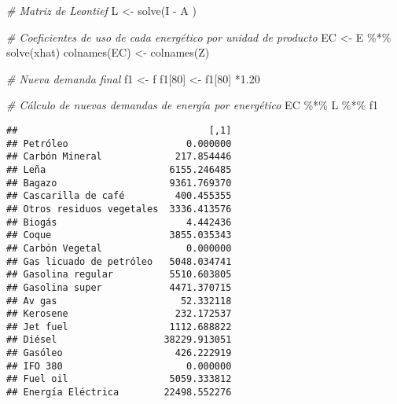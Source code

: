 \documentclass[
]{article}
\newenvironment{Shaded}{\begin{snugshade}}{\end{snugshade}}
\newcommand{\CommentTok}[1]{\textcolor[rgb]{0.56,0.35,0.01}{\textit{#1}}}
\newcommand{\DecValTok}[1]{\textcolor[rgb]{0.00,0.00,0.81}{#1}}
\newcommand{\FloatTok}[1]{\textcolor[rgb]{0.00,0.00,0.81}{#1}}
\newcommand{\FunctionTok}[1]{\textcolor[rgb]{0.00,0.00,0.00}{#1}}
\newcommand{\NormalTok}[1]{#1}
\newcommand{\OtherTok}[1]{\textcolor[rgb]{0.56,0.35,0.01}{#1}}
\newcommand{\SpecialCharTok}[1]{\textcolor[rgb]{0.00,0.00,0.00}{#1}}
\begin{document}
\begin{Shaded}
\begin{Highlighting}[]
\CommentTok{\# Matriz de Leontief}
\NormalTok{L }\OtherTok{\textless{}{-}} \FunctionTok{solve}\NormalTok{(I }\SpecialCharTok{{-}}\NormalTok{ A )}

\CommentTok{\# Coeficientes de uso de cada energético por unidad de producto}
\NormalTok{EC }\OtherTok{\textless{}{-}}\NormalTok{ E }\SpecialCharTok{\%*\%} \FunctionTok{solve}\NormalTok{(xhat)}
\FunctionTok{colnames}\NormalTok{(EC) }\OtherTok{\textless{}{-}} \FunctionTok{colnames}\NormalTok{(Z)}

\CommentTok{\# Nueva demanda final}
\NormalTok{f1 }\OtherTok{\textless{}{-}}\NormalTok{ f}
\NormalTok{f1[}\DecValTok{80}\NormalTok{] }\OtherTok{\textless{}{-}}\NormalTok{ f1[}\DecValTok{80}\NormalTok{] }\SpecialCharTok{*}\FloatTok{1.20}

\CommentTok{\# Cálculo de nuevas demandas de energía por energético}
\NormalTok{EC }\SpecialCharTok{\%*\%}\NormalTok{ L }\SpecialCharTok{\%*\%}\NormalTok{ f1}
\end{Highlighting}
\end{Shaded}

\begin{verbatim}
##                                  [,1]
## Petróleo                     0.000000
## Carbón Mineral             217.854446
## Leña                      6155.246485
## Bagazo                    9361.769370
## Cascarilla de café         400.455355
## Otros residuos vegetales  3336.413576
## Biogás                       4.442436
## Coque                     3855.035343
## Carbón Vegetal               0.000000
## Gas licuado de petróleo   5048.034741
## Gasolina regular          5510.603805
## Gasolina super            4471.370715
## Av gas                      52.332118
## Kerosene                   232.172537
## Jet fuel                  1112.688822
## Diésel                   38229.913051
## Gasóleo                    426.222919
## IFO 380                      0.000000
## Fuel oil                  5059.333812
## Energía Eléctrica        22498.552276
\end{verbatim}
\end{document}

